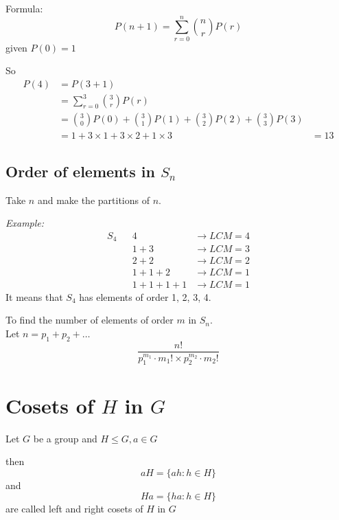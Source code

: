 \documentclass[11pt,letterpaper]{article}
\newenvironment{example}                             
        {\noindent\textit{Example:}\\}
	{}
\begin{document}
Formula: \[
  P(n+1) = \sum_{r=0}^n {n \choose r} P(r) 
\]
given $P(0) = 1$

So 
\begin{align*}
  P(4) &= P(3+1)\\ 
       &= \sum_{r=0}^3 {3 \choose r} P(r)\\ 
       &= {3 \choose 0} P(0) + {3 \choose 1} P(1) + {3 \choose 2} P(2) + {3 \choose 3} P(3) \\
       &= 1 + 3\times 1 + 3\times 2 + 1\times 3
       &= 13
\end{align*}

\subsection{Order of elements in $S_n$}
Take $n$ and make the partitions of $n$.

\begin{example}
  \begin{align*}
    S_4 && 4 &\rightarrow LCM = 4\\
        && 1 + 3 &\rightarrow LCM = 3\\
        && 2 + 2 &\rightarrow LCM = 2\\
        && 1 + 1 + 2 &\rightarrow LCM = 1\\
        && 1 + 1 + 1 + 1 &\rightarrow LCM = 1
  \end{align*}
  It means that $S_4$ has elements of order 1, 2, 3, 4.\\
\end{example}

\noindent To find the number of elements of order $m$ in $S_n$. \\
Let $n = p_1 + p_2 + \dots$\\

\[
  \frac{n!}{p_1^{m_1} \cdot m_1! \times p_2^{m_2} \cdot m_2!}
\]

\section{Cosets of $H$ in $G$} 
Let $G$ be a group and $H \leq G, a \in G$ 

then 
\[
  aH = \{ah : h \in H\}
\]
and
\[
  Ha = \{ha : h \in H\}
\]
are called left and right cosets of $H$ in $G$
\end{document}
